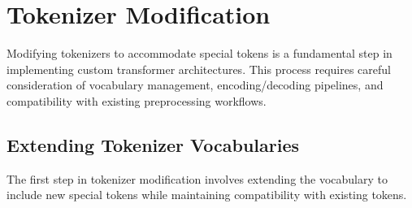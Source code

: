 
\section{Tokenizer Modification}

Modifying tokenizers to accommodate special tokens is a fundamental step in implementing custom transformer architectures. This process requires careful consideration of vocabulary management, encoding/decoding pipelines, and compatibility with existing preprocessing workflows.

\subsection{Extending Tokenizer Vocabularies}

The first step in tokenizer modification involves extending the vocabulary to include new special tokens while maintaining compatibility with existing tokens.
\begin{comment}
Feedback: Before the code, it's helpful to explain the core task. For example: "When you add a new special token like `<USER>`, you need to perform two key actions: 1) Add the token string to the tokenizer's vocabulary, and 2) Resize the model's token embedding matrix to create a new row for the token's vector representation. The `transformers` library provides a convenient `add_special_tokens` method that handles both of these steps, ensuring the tokenizer and model stay synchronized."
\end{comment}


